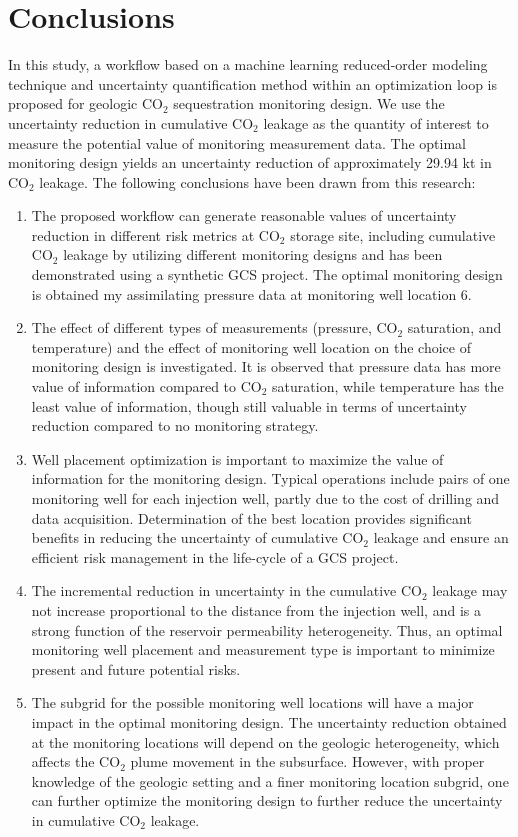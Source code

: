 \documentclass[a4paper,fleqn]{cas-sc}
\begin{document}
\section{Conclusions}
In this study, a workflow based on a machine learning reduced-order modeling technique and uncertainty quantification method within an optimization loop is proposed for geologic CO$_2$ sequestration monitoring design. We use the uncertainty reduction in cumulative CO$_2$ leakage as the quantity of interest to measure the potential value of monitoring measurement data. The optimal monitoring design yields an uncertainty reduction of approximately 29.94 kt in CO$_2$ leakage. The following conclusions have been drawn from this research:
\begin{enumerate}
    \item The proposed workflow can generate reasonable values of uncertainty reduction in different risk metrics at CO$_2$ storage site, including cumulative CO$_2$ leakage by utilizing different monitoring designs and has been demonstrated using a synthetic GCS project. The optimal monitoring design is obtained my assimilating pressure data at monitoring well location 6.
    
    \item The effect of different types of measurements (pressure, CO$_2$ saturation, and temperature) and the effect of monitoring well location on the choice of monitoring design is investigated. It is observed that pressure data has more value of information compared to CO$_2$ saturation, while temperature has the least value of information, though still valuable in terms of uncertainty reduction compared to no monitoring strategy.
    
    \item Well placement optimization is important to maximize the value of information for the monitoring design. Typical operations include pairs of one monitoring well for each injection well, partly due to the cost of drilling and data acquisition. Determination of the best location provides significant benefits in reducing the uncertainty of cumulative CO$_2$ leakage and ensure an efficient risk management in the life-cycle of a GCS project.
    
    \item The incremental reduction in uncertainty in the cumulative CO$_2$ leakage may not increase proportional to the distance from the injection well, and is a strong function of the reservoir permeability heterogeneity. Thus, an optimal monitoring well placement and measurement type is important to minimize present and future potential risks.
    
    \item The subgrid for the possible monitoring well locations will have a major impact in the optimal monitoring design. The uncertainty reduction obtained at the monitoring locations will depend on the geologic heterogeneity, which affects the CO$_2$ plume movement in the subsurface. However, with proper knowledge of the geologic setting and a finer monitoring location subgrid, one can further optimize the monitoring design to further reduce the uncertainty in cumulative CO$_2$ leakage.
\end{enumerate}
\end{document}
